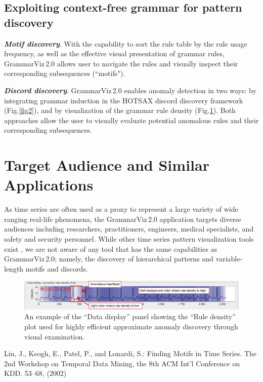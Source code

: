 \documentclass{llncs}
\begin{document}
\subsection{Exploiting context-free grammar for pattern discovery}
\textit{\textbf{Motif discovery}}. With the capability to sort the rule table by the rule usage frequency, as well as the effective visual presentation of grammar rules, \mbox{GrammarViz\,2.0} allows user to navigate the rules and visually inspect their corresponding subsequences (``motifs"). \\{\parindent0pt\textit{\textbf{Discord discovery}}. \mbox{GrammarViz\,2.0} enables anomaly detection in two ways: by integrating grammar induction in the HOTSAX discord discovery framework \cite{hot_sax} (Fig.\ref{fig2}), and by visualization of the grammar rule density (Fig.\ref{fig3}). Both approaches allow the user to visually evaluate potential anomalous rules and their corresponding subsequences.

\section{Target Audience and Similar Applications}
As time series are often used as a proxy to represent a large variety of wide ranging real-life phenomena, the \mbox{GrammarViz\,2.0} application targets diverse audiences including researchers, practitioners, engineers, medical specialists, and safety and security personnel. While other time series pattern visualization tools exist \cite{viztree, hao_motifs}, we are not aware of any tool that has the same capabilities as \mbox{GrammarViz\,2.0}; namely, the discovery of hierarchical patterns and variable-length motifs and discords.

\begin{figure}[t]
   \centering
   \includegraphics[width=115mm]{Figure3-ECG0606-density.eps}
   \caption{An example of the ``Data display'' panel showing the ``Rule density'' plot used for highly efficient approximate anomaly discovery through visual examination.}
   \label{fig3}
\end{figure}

\enlargethispage{0.8cm}

\begin{thebibliography}{4}

Lin, J., Keogh, E., Patel, P., and Lonardi, S.: 
Finding Motifs in Time Series. 
The 2nd Workshop on Temporal Data Mining, the 8th ACM Int'l Conference on KDD. 53--68, (2002)


\end{thebibliography}}
\end{document}
